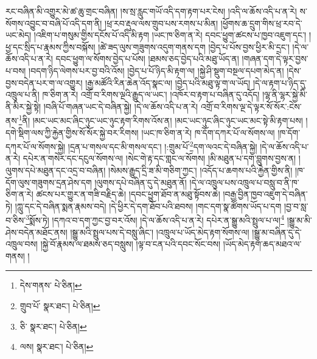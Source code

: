 རང་བཞིན་མི་འགྱུར་མེ་ཚ་ཆུ་གྲང་བཞིན། །ས་སྲ་རླུང་གཡོ་འདི་དག་རྟག་པར་ངེས། །འདི་ལ་ཆོས་འདི་པ་ན་རེ། ས་སོགས་འབྱུང་བ་བཞི་པོ་འདི་དག་ནི། །ཕྲ་རབ་རྡུལ་ལས་གྲུབ་པས་རགས་པ་མིན། །ཕྱོགས་ཆ་དྲུག་གིས་ཕྲ་རབ་དེ་ཡང་མེད། །འཇིག་པ་གསུམ་གྱིས་དངོས་པོ་འདི་མི་རྟག །ཡང་ཁ་ཅིག་ན་རེ། དབང་ཕྱུག་ཚངས་པ་ཁྱབ་འཇུག་དང་། །ཕྱ་དང་སྲིད་པ་རྣམས་ཀྱིས་བསྐོས། །ཚེ་ཟད་ལུས་གཟུགས་འདུག་གནས་དག །བྱེད་པ་པོས་བྱས་ཕྱིར་མི་དྲང་། །དེ་ལ་ཆོས་འདི་པ་ན་རེ། དབང་ཕྱུག་ལ་སོགས་བྱེད་པ་པོས། །ཐམས་ཅད་བྱེད་པའི་མཐུ་ཡོད་ན། །གཞན་དག་དེ་ལྟར་བྱས་པ་བས། །བདག་ཉིད་ལེགས་པར་བྱ་བའི་འོས། །བྱེད་པ་པོ་ཉིད་མི་རྟག་ལ། །སྐྱེ་ཤི་སྡུག་བསྔལ་དཔག་མེད་ན། །དེས་བྱས་བདེན་པར་ག་ལ་འགྱུར། །རྒྱ་མཚོའི་རིན་ཆེན་འོད་སྣང་ལ། །བྱེད་པའི་མཐུ་ལྟ་ག་ལ་ཡོད། །དེ་ལ་རྟག་པ་ཉིད་དུ་འཁྲུལ་པ་ནི། ཁ་ཅིག་ན་རེ། འགྲོ་བ་རིགས་ལྔའི་རྒྱུད་ལ་ཡང་། །འཁོར་བ་རྟག་པ་བཞིན་དུ་འདོད། །ལྷ་ནི་ལྷར་སྐྱེ་མི་ནི་མིར་སྐྱེ་སྟེ། །བཞི་པོ་གཞན་ཡང་དེ་བཞིན་སྐྱེ། །དེ་ལ་ཆོས་འདི་པ་ན་རེ། འགྲོ་བ་རིགས་ལྔ་དེ་ལྟར་སོ་སོར་:ངེས་ནས་\footnote{དེས་གནས་  པེ་ཅིན། }ནི། །མང་ཡང་མང་ཞིང་ཉུང་ཡང་ཉུང་རྟག་རིགས་འོས་ན། །མང་ཡང་ཉུང་ཞིང་ཉུང་ཡང་མང་སྟེ་མི་རྟག་པས། །དགེ་སྡིག་ལས་ཀྱི་རྐྱེན་གྱིས་སོ་སོར་སྐྱེ་བར་རིགས། །ཡང་ཁ་ཅིག་ན་རེ། ཁ་དོག་དཀར་པོ་ལ་སོགས་ལ། །ཁ་དོག་དཀར་པོ་ལ་སོགས་སྐྱེ། །དྲན་པ་གསལ་དང་མི་གསལ་དང་། །:གྲུམ་པོ་\footnote{གྲུབ་པོ་  སྣར་ཐང་།  པེ་ཅིན། }དག་ལའང་དེ་བཞིན་སྐྱེ། །དེ་ལ་ཆོས་འདི་པ་ན་རེ། དཔེར་ན་གསེར་དང་དངུལ་སོགས་ལ། །སེང་གེ་རྟ་དང་གླང་ལ་སོགས། །མི་མཐུན་པ་དག་བླུགས་བྱས་ན། །ལུགས་དཔེ་མཐུན་དང་འདྲ་བ་བཞིན། །སེམས་རྒྱུད་དྲི་ཟ་མི་གཅིག་ཀྱང་། །འདོད་པ་ཆགས་པའི་རྐྱེན་གྱིས་ནི། །ཁ་དོག་ལུས་གཟུགས་དྲན་ཤེས་དག །ལུགས་དཔེ་བཞིན་དུ་དེ་མཐུན་ནོ། །དེ་ལ་འཁྲུལ་པས་འཁྲུལ་པ་བསླུ་བ་ནི་ཁ་ཅིག་ན་རེ། ཚངས་པར་གྱུར་ན་གཟི་བརྗིད་ཆེ། །དབང་ཕྱུག་ཐོབ་ན་མཐུ་སྟོབས་ཆེ། །བརྒྱ་བྱིན་ཁྱབ་འཇུག་དེ་བཞིན་ཏེ། །ཀླུ་དང་དེ་བཞིན་སྨན་རྣམས་བདེ། །དེ་ཕྱིར་དེ་དག་ཐོབ་པའི་ཐབས། །གང་དག་སྣ་ཚོགས་ཡོད་པ་དག །བྱ་བ་སླ་བ་ཅིས་\footnote{ཅི་  སྣར་ཐང་།  པེ་ཅིན། }སྨོས་ཏེ། །དཀའ་བ་དག་ཀྱང་བྱ་བར་འོས། །དེ་ལ་ཆོས་འདི་པ་ན་རེ། དཔེར་ན་སྒྱུ་མའི་སྤྲུལ་པ་ལ།\footnote{ལས།  སྣར་ཐང་།  པེ་ཅིན། } །སྒྱུ་མ་མི་ཤེས་བདེན་མཐོང་ནས། །སྒྱུ་མའི་སྤྲུལ་པས་དེ་བསླུ་ཞིང་། །འཁྲུལ་པ་ཡོད་མེད་རྟག་སོགས་ལ། །སྒྱུ་མ་བཞིན་དུ་དེ་འཁྲུལ་བས། །སྐྱེ་བོ་རྣམས་ལ་ཐམས་ཅད་བསླུས། །ལྟ་བ་ངན་པའི་དབང་སོང་བས། །ཡོད་མེད་རྟག་ཆད་མཐའ་ལ་གནས། །
